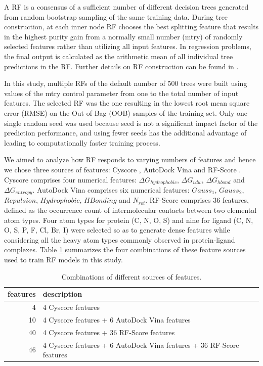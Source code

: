 \documentclass[journal=jacsat,manuscript=article]{achemso}
\begin{document}
A RF \cite{1309} is a consensus of a sufficient number of different decision trees generated from random bootstrap sampling of the same training data. During tree construction, at each inner node RF chooses the best splitting feature that results in the highest purity gain from a normally small number (mtry) of randomly selected features rather than utilizing all input features. In regression problems, the final output is calculated as the arithmetic mean of all individual tree predictions in the RF. Further details on RF construction can be found in \cite{564,1362}.

In this study, multiple RFs of the default number of 500 trees were built using values of the mtry control parameter from one to the total number of input features. The selected RF was the one resulting in the lowest root mean square error (RMSE) on the Out-of-Bag (OOB) samples of the training set. Only one single random seed was used because seed is not a significant impact factor of the prediction performance, and using fewer seeds has the additional advantage of leading to computationally faster training process.

We aimed to analyze how RF responds to varying numbers of features and hence we chose three sources of features: Cyscore \cite{1372}, AutoDock Vina \cite{595} and RF-Score \cite{564}. Cyscore comprises four numerical features: $\Delta G_{hydrophobic}$, $\Delta G_{vdw}$, $\Delta G_{hbond}$ and $\Delta G_{entropy}$. AutoDock Vina comprises six numerical features: $Gauss_1$, $Gauss_2$, $Repulsion$, $Hydrophobic$, $HBonding$ and $N_{rot}$. RF-Score comprises 36 features, defined as the occurrence count of intermolecular contacts between two elemental atom types. Four atom types for protein (C, N, O, S) and nine for ligand (C, N, O, S, P, F, Cl, Br, I) were selected so as to generate dense features while considering all the heavy atom types commonly observed in protein-ligand complexes. Table \ref{tbl:features} summarizes the four combinations of these feature sources used to train RF models in this study.

\begin{table}[h]
\caption{Combinations of different sources of features.}
\label{tbl:features}
\begin{tabular}{rl}
\hline
features & description\\
\hline
 4 & 4 Cyscore features\\
10 & 4 Cyscore features + 6 AutoDock Vina features\\
40 & 4 Cyscore features + 36 RF-Score features\\
46 & 4 Cyscore features + 6 AutoDock Vina features + 36 RF-Score features\\
\hline
\end{tabular}
\end{table}
\end{document}
